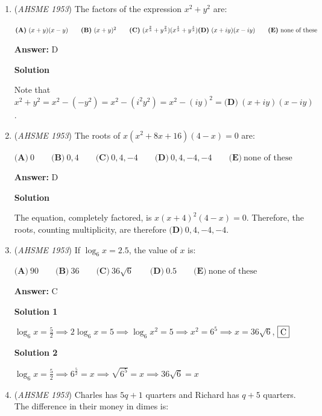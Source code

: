 \begin{enumerate}
 


	\item (\textit{AHSME 1953}) The factors of the expression $x^2+y^2$ are: 


 $\textbf{(A)}\ (x+y)(x-y) \qquad \textbf{(B)}\ (x+y)^2 \qquad \textbf{(C)}\ (x^{\frac{2}{3}}+y^{\frac{2}{3}})(x^{\frac{4}{3}}+y^{\frac{4}{3}})\\  \textbf{(D)}\ (x+iy)(x-iy)\qquad \textbf{(E)}\ \text{none of these}$

 \textbf{Answer: }D



\textbf{Solution}

Note that $x^2 + y^2 = x^2 - (-y^2) = x^2 - (i^2y^2) = x^2 - (iy)^2 = \boxed{\textbf{(D)}\ (x+iy)(x-iy)}$.

 


	\item (\textit{AHSME 1953}) The roots of $x(x^2+8x+16)(4-x)=0$ are: 


 $\textbf{(A)}\ 0 \qquad \textbf{(B)}\ 0,4 \qquad \textbf{(C)}\ 0,4,-4 \qquad \textbf{(D)}\ 0,4,-4,-4 \qquad \textbf{(E)}\ \text{none of these}$

 \textbf{Answer: }D



\textbf{Solution}

The equation, completely factored, is $x(x+4)^2(4-x)=0$.  Therefore, the roots, counting multiplicity, are therefore $\boxed{\textbf{(D)}\ 0,4,-4,-4 }$.

 


	\item (\textit{AHSME 1953}) If $\log_6 x=2.5$, the value of $x$ is: 


 $\textbf{(A)}\ 90 \qquad \textbf{(B)}\ 36 \qquad \textbf{(C)}\ 36\sqrt{6} \qquad \textbf{(D)}\ 0.5 \qquad \textbf{(E)}\ \text{none of these}$

 \textbf{Answer: }C



\textbf{Solution 1}

$\log_6 x=\frac{5}{2}\implies 2\log_6 x=5\implies \log_6 x^2=5\implies x^2=6^5\implies x=36\sqrt{6}$, $\fbox{C}$




\textbf{Solution 2}

$\log_6 x=\frac{5}{2}\implies 6^{\frac{5}{2}}=x \implies \sqrt{6^5}=x \implies 36\sqrt{6} = x$



	\item (\textit{AHSME 1953}) Charles has $5q + 1$ quarters and Richard has $q + 5$ quarters. The difference in their money in dimes is: 



\end{enumerate}
